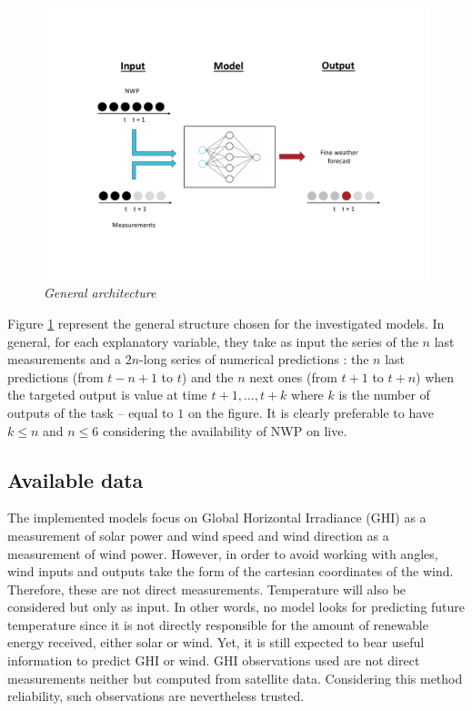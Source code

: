 \documentclass{article}
\newcommand{\saut}{\vspace{10px}}
\begin{document}
\vspace{-30px}

\begin{figure}[H]
    \centering
    \includegraphics[width=\linewidth]{img/structure.pdf}
    \vspace{-30px}
    \caption{\textit{General architecture}}
   \label{fig:Fig. 1}
\end{figure}

\saut

Figure \ref{fig:Fig. 1} represent the general structure chosen for the investigated models. In general, for each
explanatory variable, they take
as input the series of the $n$ last measurements and a $2n$-long series of numerical predictions : the $n$ last
predictions (from $t - n + 1$ to $t$) and the $n$ next ones (from $t + 1$ to $t + n$) when the targeted output is
value at time $t + 1, \dots, t + k$ where $k$ is the number of outputs of the task -- equal to $1$ on the figure.
It is clearly preferable to have $k \leq n$ and $n \leq 6$ considering the availability of NWP on live.


\subsection*{Available data}

The implemented models focus on Global Horizontal Irradiance (GHI) as a measurement of solar power
and wind speed and wind direction as a measurement of wind power.
However, in order to avoid working with angles, wind inputs and outputs
take the form of the cartesian coordinates of the wind. Therefore, these are not direct measurements. Temperature will
also be considered but only as input. In other words, no model looks for predicting future temperature since it is
not directly responsible for the amount of renewable energy received, either solar or wind. Yet, it is still expected to
bear useful information to predict GHI or wind. GHI observations used are not direct measurements neither but
computed from satellite data. Considering this method reliability, such observations are nevertheless trusted.
\end{document}
